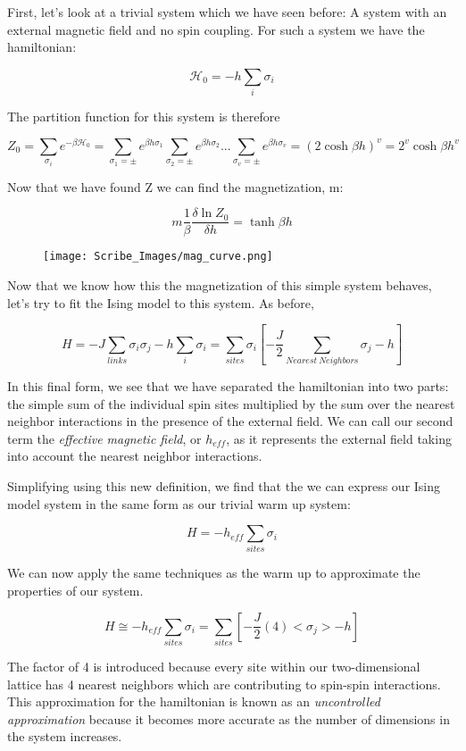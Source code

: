 \documentclass{article}
\newcommand{\pardif}[2]{\frac{\delta#1}{\delta#2}}
\newcommand{\sigi}{\sigma_{i}}
\newcommand{\sigj}{\sigma_{j}}
\begin{document}
First, let's look at a trivial system which we have seen before:  A system with an external magnetic field and no spin coupling.  For such a system we have the hamiltonian:

$$\mathcal{H}_{0}=-h\sum_{i}\sigi$$

The partition function for this system is therefore

$$Z_{0}=\sum_{\sigi}e^{-\beta\mathcal{H}_{0}}=\sum_{\sigma_{1}=\pm}e^{\beta h\sigma_{1}}\sum_{\sigma_{2}=\pm}e^{\beta h\sigma_{2}}...\sum_{\sigma_{v}=\pm}e^{\beta h\sigma_{v}}=(2\cosh{\beta h})^{v}=2^{v}\cosh{\beta h}^{v}$$

Now that we have found Z we can find the magnetization, m:

$$m\frac{1}{\beta}\pardif{\ln{Z_{0}}}{h}=\tanh{\beta h}$$

\begin{figure}[h]
	\centering
	\texttt{[image: Scribe\_Images/mag\_curve.png]}
\end{figure}

Now that we know how this the magnetization of this simple system behaves, let's try to fit the Ising model to this system.  As before,

$$H=-J\sum_{links}\sigi\sigj-h\sum_{i}\sigi=\sum_{sites}\sigi[-\frac{J}{2}\sum_{Nearest\ Neighbors}\sigj-h]$$

In this final form, we see that we have separated the hamiltonian into two parts: the simple sum of the individual spin sites multiplied by the sum over the nearest neighbor interactions in the presence of the external field.  We can call our second term the \textit{effective magnetic field}, or $h_{eff}$, as it represents the external field taking into account the nearest neighbor interactions.  

Simplifying using this new definition, we find that the we can express our Ising model system in the same form as our trivial warm up system:

$$H=-h_{eff}\sum_{sites}\sigi$$

We can now apply the same techniques as the warm up to approximate the properties of our system.

$$H\cong-h_{eff}\sum_{sites}\sigi=\sum_{sites}[-\frac{J}{2}(4)<\sigj>-h]$$

The factor of 4 is introduced because every site within our two-dimensional lattice has 4 nearest neighbors which are contributing to spin-spin interactions.  This approximation for the hamiltonian is known as an \textit{uncontrolled approximation} because it becomes more accurate as the number of dimensions in the system increases.
\end{document}
